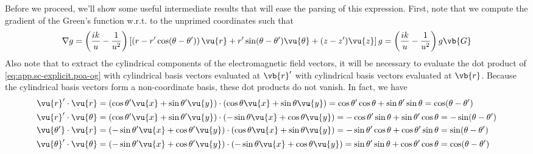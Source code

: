 \documentclass[11pt,SymmetricalJury]{inrsthesis/inrsthesis}
\begin{document}
Before we proceed, we'll show some useful intermediate results that will ease the parsing
of this expression. First, note that we compute the gradient of the Green's
function w.r.t. to the unprimed coordinates such that
  \begin{equation}
    \nabla g = \left(\frac{ik}{u}-\frac{1}{u^2}\right)\left[\left(r-r'\cos(\theta-\theta')\right)\vu{r}+r'\sin(\theta-\theta')\vu{\theta}+(z-z')\vu{z}\right]g = \left(\frac{ik}{u}-\frac{1}{u^2}\right)g\vb{G}
  \end{equation}
Also note that to extract the cylindrical components of the electromagnetic
field vectors, it will be necessary to evaluate the dot product of
\eqref{eq:app.sc-explicit.poa-og} with cylindrical basis vectors evaluated
at $\vb{r}'$ with cylindrical basis vectors evaluated at $\vb{r}$.
Because the cylindrical basis vectors form a non-coordinate basis, these
dot products do not vanish. In fact, we have
  \begin{subequations}
  \begin{align}
    \vu{r}'\cdot\vu{r}            &= (\cos\theta'\vu{x}+\sin\theta'\vu{y})\cdot(\cos\theta\vu{x}+\sin\theta\vu{y})
                                   = \cos\theta'\cos\theta+\sin\theta'\sin\theta
                                   = \cos(\theta-\theta') \\
    \vu{r}'\cdot\vu{\theta}       &= (\cos\theta'\vu{x}+\sin\theta'\vu{y})\cdot(-\sin\theta\vu{x}+\cos\theta\vu{y})
                                   = -\cos\theta'\sin\theta+\sin\theta'\cos\theta
                                   = -\sin(\theta-\theta')\\
    \vu{\theta'}\cdot\vu{r}       &= (-\sin\theta'\vu{x}+\cos\theta'\vu{y})\cdot(\cos\theta\vu{x}+\sin\theta\vu{y})
                                   = -\sin\theta'\cos\theta+\cos\theta'\sin\theta
                                   = \sin(\theta-\theta') \\
    \vu{\theta}'\cdot\vu{\theta}  &= (-\sin\theta'\vu{x}+\cos\theta'\vu{y})\cdot(-\sin\theta\vu{x}+\cos\theta\vu{y})
                                   = \sin\theta'\sin\theta+\cos\theta'\cos\theta
                                   = \cos(\theta-\theta')
  \end{align}
  \end{subequations}
\end{document}
